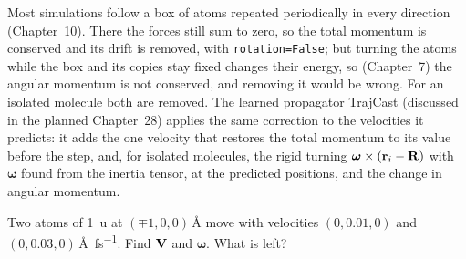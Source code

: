 \begin{practice}
Most simulations follow a box of atoms repeated periodically in every
direction (Chapter~10). There the
forces still sum to zero, so the total momentum is conserved and its drift
is removed, with \texttt{rotation=False}; but turning the atoms while the box
and its copies stay fixed changes their energy, so (Chapter~7) the angular
momentum is not conserved, and
removing it would be wrong. For an isolated molecule both are removed. The
learned propagator TrajCast (discussed in the planned Chapter~28) applies the same correction to
the velocities it predicts: it adds the one velocity that restores the
total momentum to its value before the step, and, for isolated molecules,
the rigid turning $\boldsymbol{\omega}\times(\bm{\mathrm{r}}_i - \bm{\mathrm{R}})$ with
$\boldsymbol{\omega}$ found from the inertia tensor, at the predicted
positions, and the change in
angular momentum.
\end{practice}


\begin{selfcheck}
Two atoms of \SI{1}{\amu} at $(\mp1, 0, 0)$\,\si{\angstrom} move with
velocities $(0, 0.01, 0)$ and $(0, 0.03, 0)$\,\si{\angstrom\per
\femto\second}. Find $\bm{\mathrm{V}}$ and $\boldsymbol{\omega}$. What is left?
\end{selfcheck}
